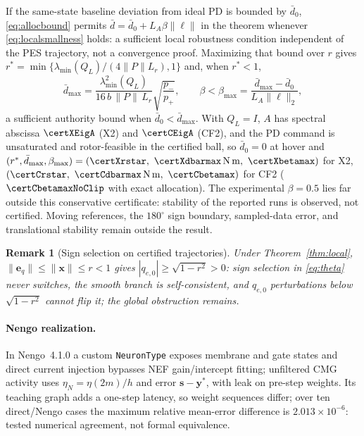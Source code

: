 \documentclass[letterpaper, 10 pt, conference]{ieeeconf}
\newtheorem{remark}{Remark}
\begin{document}
If the same-state baseline deviation from ideal PD is bounded by $\bar d_0$,
\eqref{eq:allocbound} permits $\bar d=\bar d_0+L_A\beta\|\bm\ell\|$ in the
theorem whenever \eqref{eq:localsmallness} holds: a sufficient local
robustness condition independent of the PES trajectory, not a convergence
proof. Maximizing that bound over $r$ gives
$r^*=\min\{\lambda_{\min}(Q_L)/(4\|P\|L_r),1\}$ and, when $r^*<1$,
\begin{equation}
 \bar d_{\max}=\frac{\lambda_{\min}^2(Q_L)}{16\,b\,\|P\|\,L_r}
 \sqrt{\frac{p_-}{p_+}},\qquad
 \beta<\beta_{\max}=\frac{\bar d_{\max}-\bar d_0}{L_A\|\bm\ell\|_2},
 \label{eq:betamax}
\end{equation}
a sufficient authority bound when $\bar d_0<\bar d_{\max}$. With $Q_L=I$,
$A$ has spectral abscissa $\certXEigA$ (X2) and $\certCEigA$ (CF2), and the
PD command is unsaturated and rotor-feasible in the certified ball, so
$\bar d_0=0$ at hover and
$(r^*,\bar d_{\max},\beta_{\max})=(\certXrstar,\ \certXdbarmax\,\mathrm{N\,m},\
\certXbetamax)$ for X2, $(\certCrstar,\ \certCdbarmax\,\mathrm{N\,m},\
\certCbetamax)$ for CF2 ($\certCbetamaxNoClip$ with exact allocation). The
experimental $\beta=0.5$ lies far outside this conservative certificate:
stability of the reported runs is observed, not certified. Moving
references, the $180^\circ$ sign boundary, sampled-data error, and
translational stability remain outside the result.

\begin{remark}[Sign selection on certified trajectories]
Under Theorem~\ref{thm:local}, $\|\bm e_q\|\le\|\bm x\|\le r<1$ gives
$|q_{e,0}|\ge\sqrt{1-r^2}>0$: sign selection in \eqref{eq:theta} never
switches, the smooth branch is self-consistent, and $q_{e,0}$ perturbations
below $\sqrt{1-r^2}$ cannot flip it; the global obstruction
\cite{bhat2000topological} remains.
\end{remark}

\paragraph{Nengo realization.}
In Nengo~4.1.0 a custom \texttt{NeuronType} exposes membrane and gate states and direct current injection bypasses NEF gain/intercept fitting; unfiltered CMG activity uses $\eta_N=\eta(2m)/h$ and error $\bm s-\bm y^*$, with leak on pre-step weights. Its teaching graph adds a one-step latency, so weight sequences differ; over ten direct/Nengo cases the maximum relative mean-error difference is $2.013\times10^{-6}$: tested numerical agreement, not formal equivalence.
\end{document}
